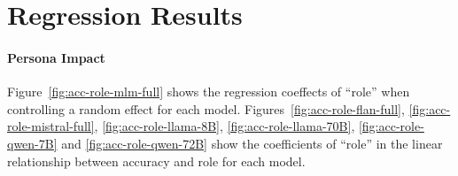 \documentclass[11pt]{article}
\begin{document}
\begin{table}[ht]
    \centering
    \caption{Control Prompts for each model}
    \label{tab:control_prompts}
\end{table}

\section{Regression Results}
\label{appendix:role-regression}

\begin{table}[ht]
    \centering
    \caption{Coefficients of the mixed-effects model on the relationship between accuracy and all the role attributes}
    \label{tab:lme_overall}
\end{table}


\paragraph{Persona Impact} Figure~\ref{fig:acc-role-mlm-full} shows the regression coeffects of ``role'' when controlling a random effect for each model. Figures~\ref{fig:acc-role-flan-full}, \ref{fig:acc-role-mistral-full}, \ref{fig:acc-role-llama-8B}, \ref{fig:acc-role-llama-70B}, \ref{fig:acc-role-qwen-7B} and \ref{fig:acc-role-qwen-72B} show the coefficients of ``role'' in the linear relationship between accuracy and role for each model.   
\end{document}
